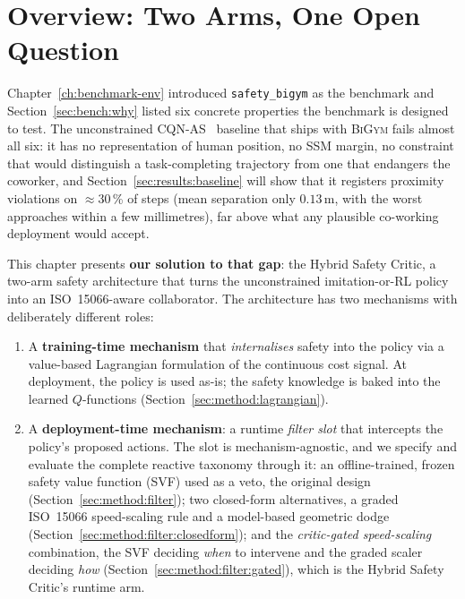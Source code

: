 \documentclass[11pt,a4paper]{report}
\newcommand{\ssm}{SSM}
\newcommand{\iso}{ISO~15066}
\newcommand{\bigym}{\textsc{BiGym}}
\newcommand{\sbigym}{\texttt{safety\_bigym}}
\newcommand{\cqnas}{CQN-AS}
\begin{document}
\section{Overview: Two Arms, One Open Question}
\label{sec:method:overview}

Chapter~\ref{ch:benchmark-env} introduced \sbigym{} as the
benchmark and Section~\ref{sec:bench:why} listed six concrete
properties the benchmark is designed to test. The unconstrained
\cqnas{}~\cite{seo2024cqnas} baseline that ships with \bigym{}
fails almost all six: it has no representation of human position,
no \ssm{} margin, no constraint that would distinguish a
task-completing trajectory from one that endangers the coworker,
and Section~\ref{sec:results:baseline} will show that it registers
proximity violations on $\approx$30\,\% of steps (mean separation only
$0.13$\,m, with the worst approaches within a few millimetres), far
above what any plausible co-working deployment would accept.

This chapter presents \textbf{our solution to that gap}: the Hybrid
Safety Critic, a two-arm safety architecture that turns the
unconstrained imitation-or-RL policy into an \iso{}-aware
collaborator. The architecture has two mechanisms with deliberately
different roles:

\begin{enumerate}[topsep=2pt,itemsep=2pt]
\item A \textbf{training-time mechanism} that \emph{internalises}
  safety into the policy via a value-based Lagrangian formulation
  of the continuous cost signal. At deployment, the policy is
  used as-is; the safety knowledge is baked into the learned
  $Q$-functions (Section~\ref{sec:method:lagrangian}).
\item A \textbf{deployment-time mechanism}: a runtime \emph{filter
  slot} that intercepts the policy's proposed actions. The slot is
  mechanism-agnostic, and we specify and evaluate the complete
  reactive taxonomy through it: an offline-trained, frozen safety
  value function (SVF) used as a veto, the original design
  (Section~\ref{sec:method:filter}); two closed-form
  alternatives, a graded \iso{} speed-scaling rule and a model-based
  geometric dodge (Section~\ref{sec:method:filter:closedform}); and
  the \emph{critic-gated speed-scaling} combination, the SVF deciding
  \emph{when} to intervene and the graded scaler deciding \emph{how}
  (Section~\ref{sec:method:filter:gated}), which is the Hybrid Safety
  Critic's runtime arm.
\end{enumerate}
\end{document}

